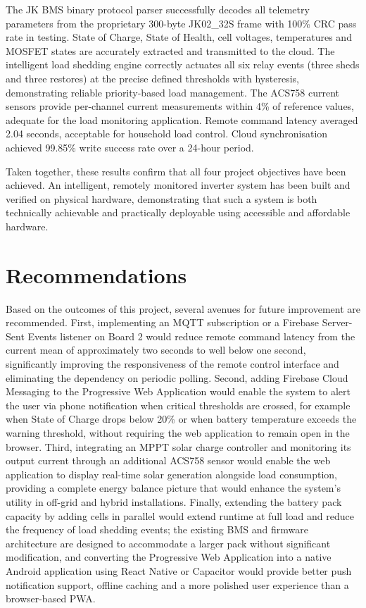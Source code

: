 \documentclass[12pt, a4paper]{report}
\begin{document}
{The JK BMS binary protocol parser successfully decodes all telemetry
parameters from the proprietary 300-byte JK02\_32S frame with 100\% CRC
pass rate in testing. State of Charge, State of Health, cell voltages,
temperatures and MOSFET states are accurately extracted and transmitted
to the cloud. The intelligent load shedding engine correctly actuates
all six relay events (three sheds and three restores) at the precise
defined thresholds with hysteresis, demonstrating reliable priority-based
load management. The ACS758 current sensors provide per-channel current
measurements within 4\% of reference values, adequate for the load
monitoring application. Remote command latency averaged 2.04 seconds,
acceptable for household load control. Cloud synchronisation achieved
99.85\% write success rate over a 24-hour period.

Taken together, these results confirm that all four project objectives
have been achieved. An intelligent, remotely monitored inverter system
has been built and verified on physical hardware, demonstrating that such
a system is both technically achievable and practically deployable using
accessible and affordable hardware.

\section{Recommendations}

Based on the outcomes of this project, several avenues for future
improvement are recommended. First, implementing an MQTT subscription or
a Firebase Server-Sent Events listener on Board 2 would reduce remote
command latency from the current mean of approximately two seconds to well
below one second, significantly improving the responsiveness of the remote
control interface and eliminating the dependency on periodic polling.
Second, adding Firebase Cloud Messaging to the Progressive Web Application
would enable the system to alert the user via phone notification when
critical thresholds are crossed, for example when State of Charge drops
below 20\% or when battery temperature exceeds the warning threshold,
without requiring the web application to remain open in the browser.
Third, integrating an MPPT solar charge controller and monitoring its
output current through an additional ACS758 sensor would enable the web
application to display real-time solar generation alongside load
consumption, providing a complete energy balance picture that would
enhance the system's utility in off-grid and hybrid installations.
Finally, extending the battery pack capacity by adding cells in parallel
would extend runtime at full load and reduce the frequency of load
shedding events; the existing BMS and firmware architecture are designed
to accommodate a larger pack without significant modification, and
converting the Progressive Web Application into a native Android
application using React Native or Capacitor would provide better push
notification support, offline caching and a more polished user experience
than a browser-based PWA.

}
\end{document}

